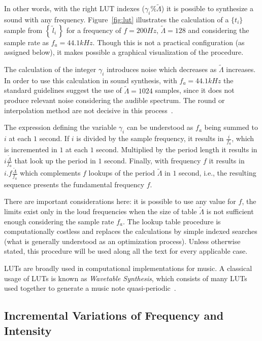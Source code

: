 \documentclass[
 aip,
 jmp,
 amsmath,amssymb,
 reprint,
]{revtex4-1}
\begin{document}
In other words, with the right LUT indexes ($\gamma_i\%\widetilde{\Lambda}$) it is possible to synthesize a sound with any frequency. Figure~\ref{fig:lut} illustrates the calculation of a $\{t_i\}$ sample from $\left\{\,\widetilde{l}_i\,\right\}$ for a frequency of $f=200Hz$, $\widetilde{\Lambda}=128$ and considering the sample rate as $f_a=44.1kHz$.
Though this is not a practical configuration (as assigned below), it makes possible a graphical visualization of the procedure.

The calculation of the integer $\gamma_i$ introduces noise which decreases as $\widetilde{\Lambda}$ increases.
In order to use this calculation in sound synthesis, with $f_a=44.1 kHz$ the standard guidelines suggest the use of $\widetilde{\Lambda} = 1024$ samples, since it does not produce relevant noise considering the audible spectrum. The round or interpolation method are not decisive in this process~\cite{Geiger}.

The expression defining the variable $\gamma_i$ can be understood as $f_a$ being summed to $i$ at each $1$ second.
If $i$ is divided by the sample frequency, it results in $\frac{i}{f_a}$,
which is incremented in $1$ at each $1$ second. Multiplied by the period length it results in $i \frac{\widetilde{\Lambda}}{f_a}$ that look up the period in $1$ second. Finally, with frequency $f$ it results in $i . f \frac{\widetilde{\Lambda}}{f_a}$ which complements $f$ lookups of the period $\widetilde{\Lambda}$ in $1$ second, i.e., the resulting sequence presents the fundamental frequency $f$.

There are important considerations here: it is possible to use any value for $f$, the limits exist only in the loud frequencies when the size of table  $\widetilde{\Lambda}$ is not sufficient enough considering the sample rate $f_a$. The lookup table procedure is computationally costless and replaces the calculations by simple indexed searches (what is generally understood as an optimization process). Unless otherwise stated, this procedure will be used along all the text for every applicable case.

LUTs are broadly used in computational implementations for music. A classical usage of LUTs is known as \emph{Wavetable Synthesis}, which consists of many LUTs used together to generate a music note quasi-periodic~\cite{Cook,Wavetable}.

\subsection{Incremental Variations of Frequency and Intensity}\label{subsec:vars}
\end{document}
